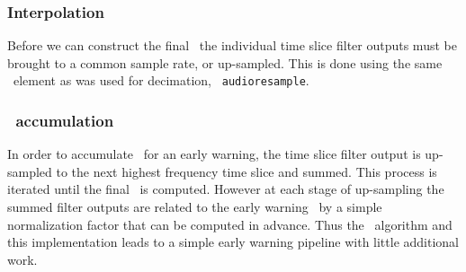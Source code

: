 \subsubsection{Interpolation}

Before we can construct the final \SNR\, the individual time slice filter
outputs must be brought to a common sample rate, or up-sampled.  This is done
using the same \gstreamer\ element as was used for decimation, {\tt
audioresample}.  

\subsubsection{\SNR\ accumulation}

In order to accumulate \SNR\ for an early warning, the time slice filter
output is up-sampled to the next highest frequency time slice and summed. This
process is iterated until the final \SNR\ is computed.  However at each stage
of up-sampling the summed filter outputs are related to the early warning \SNR\
by a simple normalization factor that can be computed in advance. Thus the
\lloid\ algorithm and this implementation leads to a simple early warning
pipeline with little additional work.
